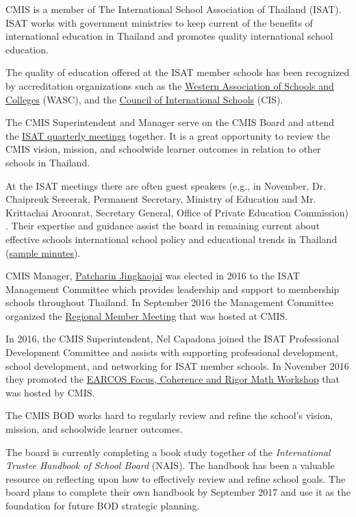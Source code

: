 \begin{findings}
CMIS is a member of The International School Association of Thailand (ISAT). ISAT works with government ministries to keep current of the benefits of international education in Thailand and promotes quality international school education.

The quality of education offered at the ISAT member schools has been recognized by accreditation organizations such as the \href{https://en.wikipedia.org/wiki/Western_Association_of_Schools_and_Colleges}{Western Association of Schools and Colleges} (WASC), and the \href{https://en.wikipedia.org/w/index.php?title=Council_of_International_Schools&action=edit&redlink=1}{Council of International Schools} (CIS).

The CMIS Superintendent and Manager serve on the CMIS Board and attend the \href{https://drive.google.com/a/cmis.ac.th/file/d/0Bwny3HLdIIS7LUtqTlR2REhsLVBkWHVib3k3V1hsWVFtUzIw/view?usp=sharing}{ISAT quarterly meetings} together. It is a great opportunity to review the CMIS vision, mission, and schoolwide learner outcomes in relation to other schools in Thailand. 

At the ISAT meetings there are often guest speakers (e.g., in November, Dr. Chaipreuk Sereerak, Permanent Secretary, Ministry of Education and Mr. Krittachai Aroonrat, Secretary General, Office of Private Education Commission) . Their expertise and guidance assist the board in remaining current about effective schools international school policy and educational trends in Thailand (\href{http://www.isat.or.th/members/announcement-updates/minutes-isat-general-member-meeting-22016}{sample minutes}).

CMIS Manager, \href{https://drive.google.com/a/cmis.ac.th/file/d/0Bwo-i12FeO0rY1V1SGtuSzJBd1U/view?usp=sharing}{Patcharin Jingkaojai} was elected in 2016 to the ISAT Management Committee which provides leadership and support to membership schools throughout Thailand. In September 2016 the Management Committee organized the \href{https://drive.google.com/a/cmis.ac.th/file/d/0Bwo-i12FeO0rQ0JOZ09JVTNEUTA/view?usp=sharing}{Regional Member Meeting} that was hosted at CMIS. 

In 2016, the CMIS Superintendent, Nel Capadona joined the ISAT Professional Development Committee and assists with supporting professional development, school development, and networking for ISAT member schools. In November 2016 they promoted the \href{https://drive.google.com/a/cmis.ac.th/file/d/0ByVFfrm0zfolSXFEZFJVN1VOaTQ/view?usp=sharing}{EARCOS Focus, Coherence and Rigor Math Workshop} that was hosted by CMIS.


The CMIS BOD works hard to regularly review and refine the school’s vision, mission, and schoolwide learner outcomes. 

The board is currently completing a book study together of the \textit{International Trustee Handbook of School Board} (NAIS). The handbook has been a valuable resource on reflecting upon how to effectively review and refine school goals. The board plans to complete their own handbook by September 2017 and use it as the foundation for future BOD strategic planning.

\end{findings}

